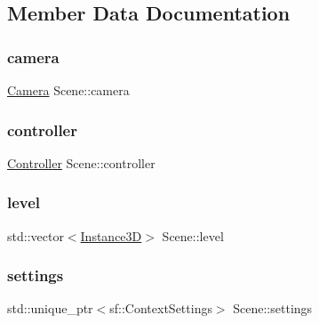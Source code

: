\subsection{Member Data Documentation}
\mbox{\label{classScene_afed13ec4ba2d7ab75b273d507911b498}} 
\subsubsection{\texorpdfstring{camera}{camera}}
{\footnotesize\ttfamily \hyperlink{classCamera}{Camera} Scene\+::camera\hspace{0.3cm}{\ttfamily [private]}}

\mbox{\label{classScene_aac14170851aa8186820beae6a2097bc9}} 
\subsubsection{\texorpdfstring{controller}{controller}}
{\footnotesize\ttfamily \hyperlink{classController}{Controller} Scene\+::controller\hspace{0.3cm}{\ttfamily [private]}}

\mbox{\label{classScene_a04300c11c1aaaaae2019e0f9208c9252}} 
\subsubsection{\texorpdfstring{level}{level}}
{\footnotesize\ttfamily std\+::vector$<$\hyperlink{classInstance3D}{Instance3D}$>$ Scene\+::level\hspace{0.3cm}{\ttfamily [private]}}

\mbox{\label{classScene_a23cafa9acb6cc5caa3d3cfa001aea369}} 
\subsubsection{\texorpdfstring{settings}{settings}}
{\footnotesize\ttfamily std\+::unique\+\_\+ptr$<$sf\+::\+Context\+Settings$>$ Scene\+::settings\hspace{0.3cm}{\ttfamily [private]}}

